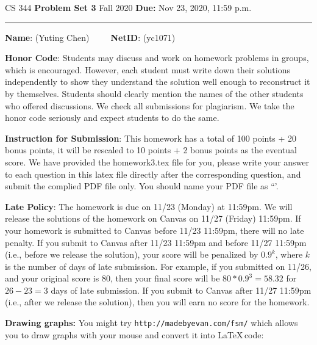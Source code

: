\documentclass[12pt]{article}
\begin{document}
\noindent
CS 344 \hfill \textbf{Problem Set 3} \newline 
{Fall 2020} \hfill \textbf{Due:} Nov 23, 2020, 11:59 p.m.

\noindent
\rule{\linewidth}{0.4pt}
\vspace{.4cm}

\textbf{Name}: ({\color{blue}Yuting Chen})~~~~~\textbf{NetID}: ({\color{blue}yc1071})

\vspace{.5cm}

\textbf{Honor Code}: Students may discuss and work on homework problems in groups, which is encouraged. However, each student must write down their solutions independently to show they understand the solution well enough to reconstruct it by themselves.  Students should clearly mention the names of the other students who offered discussions. We check all submissions for plagiarism. We take the honor code seriously and expect students to do the same.


\vspace{.5cm}

\textbf{Instruction for Submission}: This homework has a total of 100 points + 20 bonus points, it will be rescaled to 10 points + 2 bonus points as the eventual score. We have provided the homework3.tex file for you, please write your answer to each question in this latex file directly after the corresponding question, and submit the complied PDF file only. You should name your PDF file as ``{\color{blue}{Firstname-Lastname-NetID.pdf'}}'.

\vspace{.5cm}

\textbf{Late Policy}: The homework is due on 11/23 (Monday) at 11:59pm. We will release the solutions of the homework on Canvas on 11/27 (Friday) 11:59pm. If your homework is submitted to Canvas before 11/23 11:59pm, there will no late penalty. If you submit to Canvas after 11/23 11:59pm and before 11/27 11:59pm (i.e., before we release the solution), your score will be penalized by $0.9^k$, where $k$ is the number of days of late submission. For example, if you submitted on 11/26, and your original score is 80, then your final score will be $80*0.9^3=58.32$ for $26-23=3$ days of late submission. If you submit to Canvas after 11/27 11:59pm (i.e., after we release the solution), then you will earn no score for the homework.

\vspace{.5cm}

\noindent
\textbf{Drawing graphs:} You might try \texttt{http://madebyevan.com/fsm/} which allows you to draw graphs with your mouse and convert it into \LaTeX  \,code:
\end{document}
